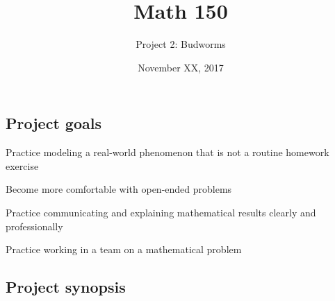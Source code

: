 \documentclass{article}
\title{Math 150}
\author{Project 2: Budworms}
\date{November XX, 2017}
\begin{document}


\thispagestyle{empty}
\maketitle
{}
\thispagestyle{empty} \pagestyle{empty}

\subsection*{Project goals}
\begin{compactitem}
    \item Practice modeling a real-world phenomenon that is not a routine
        homework exercise
    \item Become more comfortable with open-ended problems
    \item Practice communicating and explaining mathematical results clearly
        and professionally
    \item Practice working in a team on a mathematical problem
\end{compactitem}

\subsection*{Project synopsis}
\vspace{-2.8ex}
\end{document}
